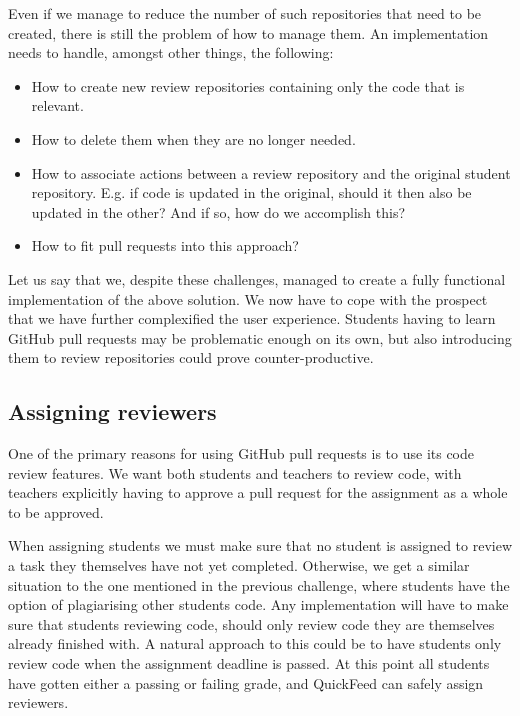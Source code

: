 Even if we manage to reduce the number of such repositories that need to be created, there is still the problem of how to manage them.
An implementation needs to handle, amongst other things, the following:

\begin{itemize}
    \item How to create new review repositories containing only the code that is relevant.
    \item How to delete them when they are no longer needed.
    \item How to associate actions between a review repository and the original student repository.
          E.g. if code is updated in the original, should it then also be updated in the other?
          And if so, how do we accomplish this?
    \item How to fit pull requests into this approach?
\end{itemize}

Let us say that we, despite these challenges, managed to create a fully functional implementation of the above solution.
We now have to cope with the prospect that we have further complexified the user experience.
Students having to learn GitHub pull requests may be problematic enough on its own, but also introducing them to review repositories could prove counter-productive.

\subsection{Assigning reviewers}

One of the primary reasons for using GitHub pull requests is to use its code review features.
We want both students and teachers to review code, with teachers explicitly having to approve a pull request for the assignment as a whole to be approved.

When assigning students we must make sure that no student is assigned to review a task they themselves have not yet completed.
Otherwise, we get a similar situation to the one mentioned in the previous challenge, where students have the option of plagiarising other students code.
Any implementation will have to make sure that students reviewing code, should only review code they are themselves already finished with.
A natural approach to this could be to have students only review code when the assignment deadline is passed.
At this point all students have gotten either a passing or failing grade, and QuickFeed can safely assign reviewers.

